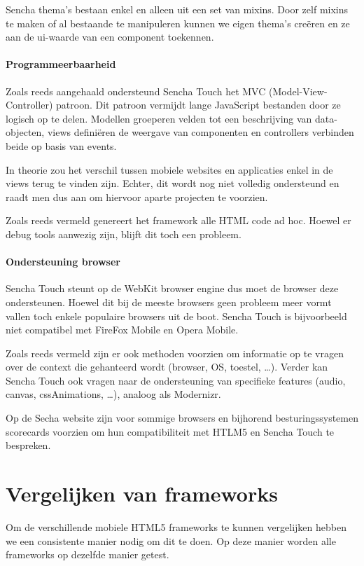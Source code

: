 Sencha thema's bestaan enkel en alleen uit een set van mixins.  Door zelf mixins te maken of al bestaande te manipuleren kunnen we eigen thema's creëren en ze aan de ui-waarde van een component toekennen.

\paragraph{Programmeerbaarheid}
Zoals reeds aangehaald ondersteund Sencha Touch het MVC (Model-View-Controller) patroon.  Dit patroon vermijdt lange JavaScript bestanden door ze logisch op te delen.  Modellen groeperen velden tot een beschrijving van data-objecten,  views definiëren de weergave van componenten en controllers verbinden beide op basis van events.

In theorie zou het verschil tussen mobiele websites en applicaties enkel in de views terug te vinden zijn.  Echter,  dit wordt nog niet volledig ondersteund en raadt men dus aan om hiervoor aparte projecten te voorzien.

Zoals reeds vermeld genereert het framework alle HTML code ad hoc. Hoewel er debug tools aanwezig zijn, blijft dit toch een probleem.  

\paragraph{Ondersteuning browser}
Sencha Touch steunt op de WebKit browser engine dus moet de browser deze ondersteunen.  Hoewel dit bij de meeste browsers geen probleem meer vormt vallen toch enkele populaire browsers uit de boot.  Sencha Touch is bijvoorbeeld niet compatibel met FireFox Mobile en Opera Mobile.

Zoals reeds vermeld zijn er ook methoden voorzien om informatie op te vragen over de context die gehanteerd wordt (browser, OS, toestel, …).  Verder kan Sencha Touch ook vragen naar de ondersteuning van specifieke features (audio,  canvas,  cssAnimations, …),  analoog als Modernizr.  

Op de Secha website zijn voor sommige browsers en bijhorend besturingssystemen scorecards voorzien om hun compatibiliteit met HTLM5 en Sencha Touch te bespreken.


\section{Vergelijken van frameworks}
\label{sec:vergelijken-frameworks}
Om de verschillende mobiele HTML5 frameworks te kunnen vergelijken hebben we een consistente manier nodig om dit te doen.  Op deze manier worden alle frameworks op dezelfde manier getest.

